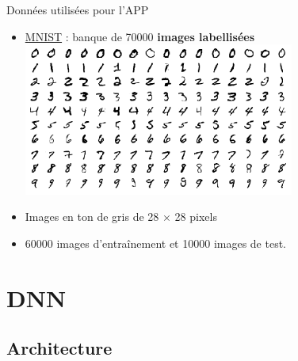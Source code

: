\documentclass[10pt,serif,mathserif,compress,hyperref={colorlinks}]{beamer}
\begin{document}
\begin{frame}{Données utilisées pour l'APP}

  \begin{itemize}
  \item \href{http://yann.lecun.com/exdb/mnist/}{MNIST} : banque de 70000 \textbf{images labellisées}\\[3mm]
    \includegraphics[width=0.7\textwidth]{images/MNIST_digits_sample.png}
  \item Images en ton de gris de 28 $\times$ 28 pixels
  \item 60000 images d'entraînement et 10000 images de test.
  \end{itemize}       
  
\end{frame}

\section{DNN}

\subsection{Architecture}
\end{document}
